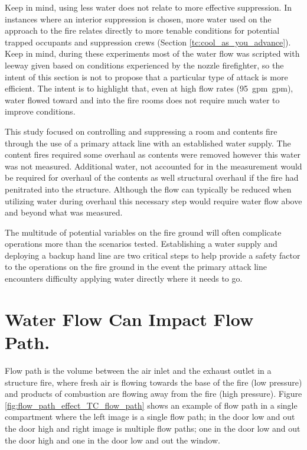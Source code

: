 \documentclass[12pt,oneside]{book}
\begin{document}
Keep in mind, using less water does not relate to more effective suppression. In instances where an interior suppression is chosen, more water used on the approach to the fire relates directly to more tenable conditions for potential trapped occupants and suppression crews (Section \ref{tc:cool_as_you_advance}). Keep in mind, during these experiments most of the water flow was scripted with leeway given based on conditions experienced by the nozzle firefighter, so the intent of this section is not to propose that a particular type of attack is more efficient. The intent is to highlight that, even at high flow rates (95~gpm~gpm), water flowed toward and into the fire rooms does not require much water to improve conditions.

This study focused on controlling and suppressing a room and contents fire through the use of a primary attack line with an established water supply. The content fires required some overhaul as contents were removed however this water was not measured. Additional water, not accounted for in the measurement would be required for overhaul of the contents as well structural overhaul if the fire had penitrated into the structure. Although the flow can typically be reduced when utilizing water during overhaul this necessary step would require water flow above and beyond what was measured.

The multitude of potential variables on the fire ground will often complicate operations more than the scenarios tested. Establishing a water supply and deploying a backup hand line are two critical steps to help provide a safety factor to the operations on the fire ground in the event the primary attack line encounters difficulty applying water directly where it needs to go.  

\section{Water Flow Can Impact Flow Path.} \label{tc:water_impact_flowpath}
Flow path is the volume between the air inlet and the exhaust outlet in a structure fire, where fresh air is flowing towards the base of the fire (low pressure) and products of combustion are flowing away from the fire (high pressure). Figure \ref{fig:flow_path_effect_TC_flow_path} shows an example of flow path in a single compartment where the left image is a single flow path; in the door low and out the door high and right image is multiple flow paths; one in the door low and out the door high and one in the door low and out the window. 
\end{document}
